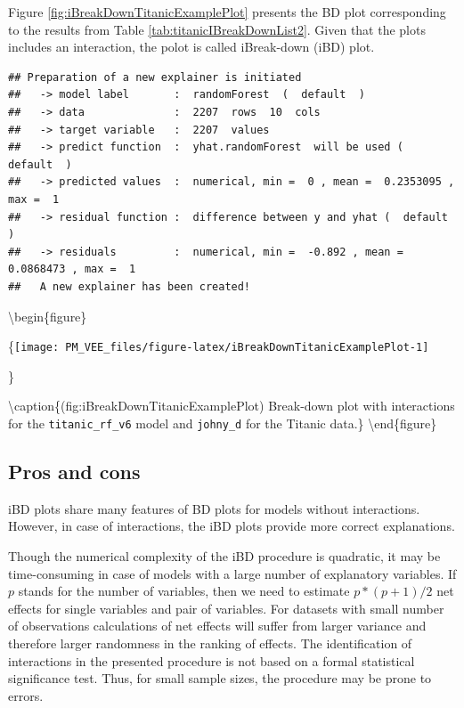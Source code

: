 \documentclass[12pt,]{krantz}
\begin{document}
Figure \ref{fig:iBreakDownTitanicExamplePlot} presents the BD plot corresponding to the results from Table \ref{tab:titanicIBreakDownList2}. Given that the plots includes an interaction, the polot is called iBreak-down (iBD) plot.

\begin{verbatim}
## Preparation of a new explainer is initiated
##   -> model label       :  randomForest  (  default  )
##   -> data              :  2207  rows  10  cols 
##   -> target variable   :  2207  values 
##   -> predict function  :  yhat.randomForest  will be used (  default  )
##   -> predicted values  :  numerical, min =  0 , mean =  0.2353095 , max =  1  
##   -> residual function :  difference between y and yhat (  default  )
##   -> residuals         :  numerical, min =  -0.892 , mean =  0.0868473 , max =  1  
##   A new explainer has been created!
\end{verbatim}

\textbackslash{}begin\{figure\}

\{\centering \texttt{[image: PM\_VEE\_files/figure-latex/iBreakDownTitanicExamplePlot-1]}

\}

\textbackslash{}caption\{(fig:iBreakDownTitanicExamplePlot) Break-down plot with interactions for the \texttt{titanic\_rf\_v6} model and \texttt{johny\_d} for the Titanic data.\}\label{fig:iBreakDownTitanicExamplePlot}
\textbackslash{}end\{figure\}

\hypertarget{iBDProsCons}{%
\subsection{Pros and cons}\label{iBDProsCons}}

iBD plots share many features of BD plots for models without interactions. However, in case of interactions, the iBD plots provide more correct explanations.

Though the numerical complexity of the iBD procedure is quadratic, it may be time-consuming in case of models with a large number of explanatory variables. If \(p\) stands for the number of variables, then we need to estimate \(p*(p+1)/2\) net effects for single variables and pair of variables. For datasets with small number of observations calculations of net effects will suffer from larger variance and therefore larger randomness in the ranking of effects.
The identification of interactions in the presented procedure is not based on a formal statistical significance test. Thus, for small sample sizes, the procedure may be prone to errors.
\end{document}
